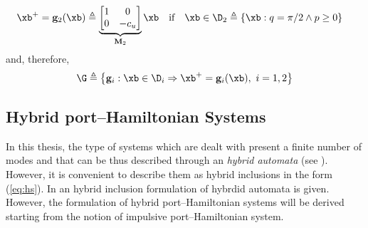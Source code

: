 \begin{exmp}
\begin{align}
        &\xb^+ = \mathbf{g}_2(\xb) \triangleq \underbrace{\begin{bmatrix}1&0\\0&-c_u\end{bmatrix}}_{\mathbf{M}_2}\xb\quad\text{if}\quad\xb\in\D_2\triangleq\left\{\xb:q=\pi/2\land p\geq 0\right\}
    \end{align}
    and, therefore,
    \begin{equation}
        \G\triangleq\left\{\mathbf{g}_i:\xb\in\D_i\Rightarrow\xb^+ = \mathbf{g}_i(\xb),~i = 1,2\right\}
    \end{equation}
    \end{exmp}
%
\subsection{Hybrid port--Hamiltonian Systems}
%

In this thesis, the type of systems which are dealt with present a finite number of modes and that can be thus described through an \textit{hybrid automata} (see \cite{van2000introduction}). However, it is convenient to describe them as hybrid inclusions in the form (\ref{eq:hs}). In \citep{goebel2009hybrid} an hybrid inclusion formulation of hybrdid automata is given. However, the formulation of hybrid port--Hamiltonian systems will be derived starting from the notion of impulsive port--Hamiltonian system.

